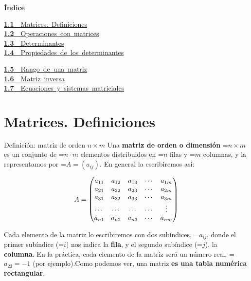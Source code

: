 \documentclass[11pt,a4paper]{article}
\newcommand{\fmm}[1]{\setbox0=\hbox{$#1$}\ifdim\wd0>\linewidth\fmdisp{#1}\else\mbox{\box0}\fi}
\newcommand{\fmdisp}[1]{\[\setbox2=\hbox{$\displaystyle #1$}\ifdim\wd2>\linewidth\resizebox{\linewidth}{!}{\box2}\else\box2\fi\]}
\newcommand{\fmuline}[1]{\textbf{\color{fmaccent}#1}}
\begin{document}
\begin{tcolorbox}[colback=fmsurface,colframe=fmsurface,arc=3mm,left=4mm,right=4mm,top=2mm,bottom=2mm]
\small\textbf{Índice}\par\smallskip
\begin{minipage}[t]{0.49\linewidth}\small \mbox{\hyperlink{sec1}{\textbf{\color{fmgreen}1.1}\ \ Matrices. Definiciones}}\\[3pt]
\mbox{\hyperlink{sec2}{\textbf{\color{fmgreen}1.2}\ \ Operaciones con matrices}}\\[3pt]
\mbox{\hyperlink{sec3}{\textbf{\color{fmgreen}1.3}\ \ Determinantes}}\\[3pt]
\mbox{\hyperlink{sec4}{\textbf{\color{fmgreen}1.4}\ \ Propiedades de los determinantes}}\\[3pt]\end{minipage}\hfill\begin{minipage}[t]{0.49\linewidth}\small \mbox{\hyperlink{sec5}{\textbf{\color{fmgreen}1.5}\ \ Rango de una matriz}}\\[3pt]
\mbox{\hyperlink{sec6}{\textbf{\color{fmgreen}1.6}\ \ Matriz inversa}}\\[3pt]
\mbox{\hyperlink{sec7}{\textbf{\color{fmgreen}1.7}\ \ Ecuaciones y sistemas matriciales}}\\[3pt]\end{minipage}
\end{tcolorbox}

\section{Matrices. Definiciones}\hypertarget{sec1}{}

\begin{fmdef}{Definición: matriz de orden $n\times m$}
Una \textbf{matriz de orden o dimensión} \fmm{n\times m} es un conjunto de \fmm{n\cdot m} elementos distribuidos en \fmm{n} filas y \fmm{m} columnas, y la representamos por \fmm{A=(a_{ij})}. En general la escribiremos así:

\fmdisp{A=\begin{pmatrix} a_{11} & a_{12} & a_{13} & \cdots & a_{1m}\\ a_{21} & a_{22} & a_{23} & \cdots & a_{2m}\\ a_{31} & a_{32} & a_{33} & \cdots & a_{3m}\\ \cdots & \cdots & \cdots & \cdots & \vdots\\ a_{n1} & a_{n2} & a_{n3} & \cdots & a_{nm}\end{pmatrix}}

Cada elemento de la matriz lo escribiremos con dos subíndices, \fmm{a_{ij}}, donde el primer subíndice (\fmm{i}) nos indica la \textbf{fila}, y el segundo subíndice (\fmm{j}), la \textbf{columna}. En la práctica, cada elemento de la matriz será un número real, \fmm{a_{23}=-1} (por ejemplo).\newline Como podemos ver, una matriz \fmuline{es una tabla numérica rectangular}.
\end{fmdef}
\end{document}

